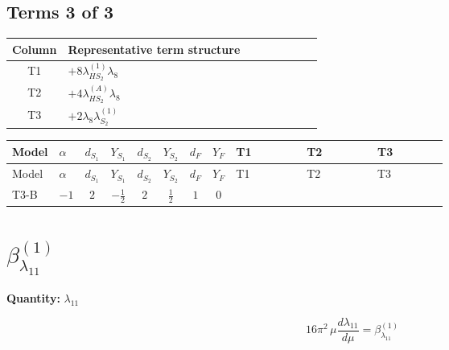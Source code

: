 \documentclass[8pt]{article}
\begin{document}
\begin{landscape}
\subsection*{Terms 3 of 3}
\begin{center}
\begin{tabular}{@{}c >{\raggedright\arraybackslash}p{0.82\linewidth}@{}}
\toprule
Column & Representative term structure \\
\midrule
T1 & \(\displaystyle +8 {\lambda_{HS_2}^{(1)}} {\lambda_8}\) \\
\midrule
T2 & \(\displaystyle +4 {\lambda_{HS_2}^{(A)}} {\lambda_8}\) \\
\midrule
T3 & \(\displaystyle +2 {\lambda_8} {\lambda_{S_2}^{(1)}}\) \\
\midrule
\bottomrule
\end{tabular}
\end{center}
\smallskip
\tiny
\begin{longtable}{@{}llcccccc >{\raggedright\arraybackslash}p{0.21\linewidth} >{\raggedright\arraybackslash}p{0.21\linewidth} >{\raggedright\arraybackslash}p{0.21\linewidth}@{}}
\toprule
Model & $\alpha$ & $d_{S_1}$ & $Y_{S_1}$ & $d_{S_2}$ & $Y_{S_2}$ & $d_F$ & $Y_F$ & T1 & T2 & T3 \\
\midrule
\endfirsthead
\toprule
Model & $\alpha$ & $d_{S_1}$ & $Y_{S_1}$ & $d_{S_2}$ & $Y_{S_2}$ & $d_F$ & $Y_F$ & T1 & T2 & T3 \\
\midrule
\endhead
T3-B & $-1$ & $2$ & $-\frac{1}{2}$ & $2$ & $\frac{1}{2}$ & $1$ & $0$ & \scriptsize\adjustbox{max width=\linewidth}{$\begin{gathered} +8 {\lambda_{HS_2}^{(1)}} {\lambda_8}\end{gathered}$} & \scriptsize\adjustbox{max width=\linewidth}{$\begin{gathered} +4 {\lambda_{HS_2}^{(A)}} {\lambda_8}\end{gathered}$} & \scriptsize\adjustbox{max width=\linewidth}{$\begin{gathered} +2 {\lambda_8} {\lambda_{S_2}^{(1)}}\end{gathered}$} \\
\midrule
\bottomrule
\end{longtable}
\clearpage
\section*{$\beta_{\lambda_{11}}^{(1)}$}
\noindent\textbf{Quantity: }$\lambda_{11}$\par\smallskip
\[16\pi^2\,\mu\frac{d \lambda_{11}}{d\mu}=\beta_{\lambda_{11}}^{(1)}\]

\end{landscape}
\end{document}
